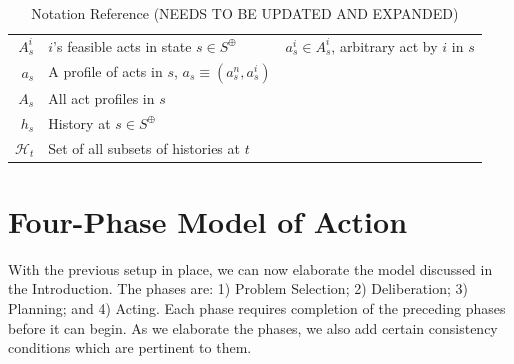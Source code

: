 \documentclass[
11pt,
titlepage,
reqno,
]{article}%
\theoremstyle{definition}
\begin{document}
\begin{table}
\begin{tabular}{@{}rll@{}}
$A^i_s$                                           & $i$'s feasible acts in state $s\in S^\oplus$               & $a^i_s\in A^i_s$,  arbitrary act by $i$ in $s$\\
$a_s$                                       & A profile of acts in $s$, $a_s\equiv(a^n_s,a^i_s)$ & \\
$A_s$                                    & All act profiles in $s$                               & \\
$h_s$                                & History at $s\in S^\oplus$                                    &  \\
$\mathcal{H}_t$                                    & Set of all subsets of histories at $t$                & \\
\bottomrule
\end{tabular}
\caption{Notation Reference (NEEDS TO BE UPDATED AND EXPANDED)}\label{Tab: Notation}
\end{table}
\pagebreak

\section{Four-Phase Model of Action}

With the previous setup in place, we can now elaborate the model discussed in the Introduction.
The phases are: 1) Problem Selection; 2) Deliberation; 3) Planning; and 4) Acting.
Each phase requires completion of the preceding phases before it can begin.
As we elaborate the phases, we also add certain consistency conditions which are pertinent to them.
\end{document}
